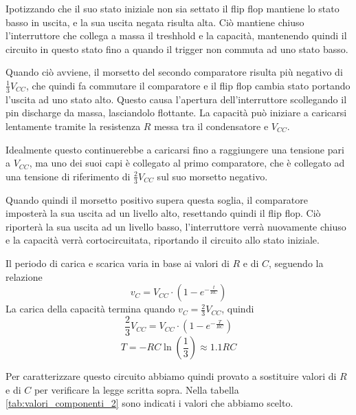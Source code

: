 \noindent
Ipotizzando che il suo stato iniziale non sia settato il flip flop mantiene lo stato basso in uscita, e la sua uscita negata risulta alta. Ciò mantiene chiuso l'interruttore che collega a massa il treshhold e la capacità, mantenendo quindi il circuito in questo stato fino a quando il trigger non commuta ad uno stato basso.

\noindent
Quando ciò avviene, il morsetto del secondo comparatore risulta più negativo di $\frac{1}{3}V_{CC}$, che quindi fa commutare il comparatore e il flip flop cambia stato portando l'uscita ad uno stato alto. Questo causa l'apertura dell'interruttore scollegando il pin discharge da massa, lasciandolo flottante.
La capacità può iniziare a caricarsi lentamente tramite la resistenza $R$ messa tra il condensatore e $V_{CC}$. 

\noindent
Idealmente questo continuerebbe a caricarsi fino a raggiungere una tensione pari a $V_{CC}$, ma uno dei suoi capi è collegato al primo comparatore, che è collegato ad una tensione di riferimento di $\frac{2}{3}V_{CC}$ sul suo morsetto negativo. 

\noindent
Quando quindi il morsetto positivo supera questa soglia, il comparatore imposterà la sua uscita ad un livello alto, resettando quindi il flip flop. Ciò riporterà la sua uscita ad un livello basso, l'interruttore verrà nuovamente chiuso e la capacità verrà cortocircuitata, riportando il circuito allo stato iniziale.

\noindent
Il periodo di carica e scarica varia in base ai valori di $R$ e di $C$, seguendo la relazione
\[v_C = V_{CC}\cdot\left(1-e^{-\frac{t}{RC}}\right)\]
La carica della capacità termina quando $v_C = \frac{2}{3}V_{CC}$, quindi
\[\frac{2}{3}V_{CC} = V_{CC}\cdot\left(1-e^{-\frac{T}{RC}}\right)\]
\[T=-RC\ln\left(\frac{1}{3}\right)\approx1.1RC\]

Per caratterizzare questo circuito abbiamo quindi provato a sostituire valori di $R$ e di $C$ per verificare la legge scritta sopra. Nella tabella \ref{tab:valori_componenti_2} sono indicati i valori che abbiamo scelto.

